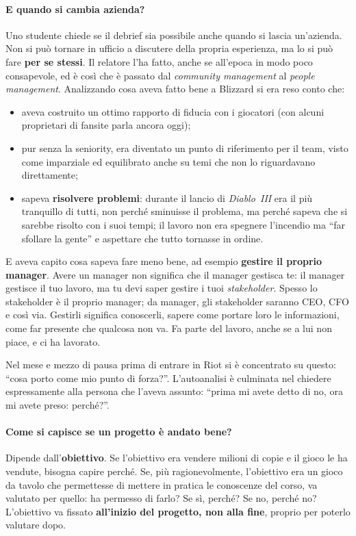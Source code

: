 \paragraph{E quando si cambia azienda?} Uno studente chiede se il debrief sia
possibile anche quando si lascia un'azienda. Non si può tornare in ufficio a
discutere della propria esperienza, ma lo si può fare \textbf{per se stessi}.
Il relatore l'ha fatto, anche se all'epoca in modo poco consapevole, ed è
così che è passato dal \emph{community management} al \emph{people
management}. Analizzando cosa aveva fatto bene a Blizzard si era reso conto
che:
\begin{itemize}
  \item aveva costruito un ottimo rapporto di fiducia con i giocatori (con
        alcuni proprietari di fansite parla ancora oggi);
  \item pur senza la seniority, era diventato un punto di riferimento per il
        team, visto come imparziale ed equilibrato anche su temi che non lo
        riguardavano direttamente;
  \item sapeva \textbf{risolvere problemi}: durante il lancio di
        \emph{Diablo~III} era il più tranquillo di tutti, non perché
        sminuisse il problema, ma perché sapeva che si sarebbe risolto con i
        suoi tempi; il lavoro non era spegnere l'incendio ma ``far sfollare
        la gente'' e aspettare che tutto tornasse in ordine.
\end{itemize}
E aveva capito cosa sapeva fare meno bene, ad esempio \textbf{gestire il
proprio manager}. Avere un manager non significa che il manager gestisca te:
il manager gestisce il tuo lavoro, ma tu devi saper gestire i tuoi
\emph{stakeholder}. Spesso lo stakeholder è il proprio manager; da manager,
gli stakeholder saranno CEO, CFO e così via. Gestirli significa conoscerli,
sapere come portare loro le informazioni, come far presente che qualcosa non
va. Fa parte del lavoro, anche se a lui non piace, e ci ha lavorato.

Nel mese e mezzo di pausa prima di entrare in Riot si è concentrato su
questo: ``cosa porto come mio punto di forza?''. L'autoanalisi è culminata
nel chiedere espressamente alla persona che l'aveva assunto: ``prima mi avete
detto di no, ora mi avete preso: perché?''.

\paragraph{Come si capisce se un progetto è andato bene?} Dipende
dall'\textbf{obiettivo}. Se l'obiettivo era vendere milioni di copie e il
gioco le ha vendute, bisogna capire perché. Se, più ragionevolmente,
l'obiettivo era un gioco da tavolo che permettesse di mettere in pratica le
conoscenze del corso, va valutato per quello: ha permesso di farlo? Se sì,
perché? Se no, perché no? L'obiettivo va fissato \textbf{all'inizio del
progetto, non alla fine}, proprio per poterlo valutare dopo.

